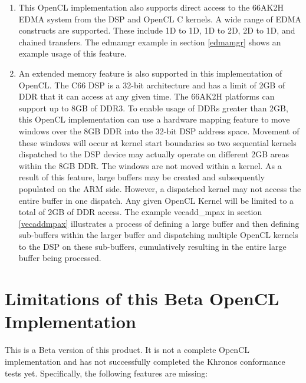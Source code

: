 \documentclass[10pt]{article}
\begin{document}
\begin{enumerate}
\item This OpenCL implementation also supports direct access to the 66AK2H
EDMA system from the DSP and OpenCL C kernels.  A wide range of EDMA
constructs are supported.  These include 1D to 1D, 1D to 2D, 2D to 1D, and chained
transfers.  The edmamgr example in section \ref{edmamgr} shows an example
usage of this feature.

\item An extended memory feature is also supported in this implementation of
OpenCL.  The C66 DSP is a 32-bit architecture and has a limit of 2GB of DDR
that it can access at any given time. The 66AK2H platforms can support up to
8GB of DDR3.  To enable usage of DDRs greater than 2GB, this OpenCL
implementation can use a hardware mapping feature to move windows over the 8GB
DDR into the 32-bit DSP address space.  Movement of these windows will occur
at kernel start boundaries so two sequential kernels dispatched to the DSP
device may actually operate on different 2GB areas within the 8GB DDR.  The
windows are not moved within a kernel.  As a result of this feature, large
buffers may be created and subsequently populated on the ARM side.  However, a
dispatched kernel may not access the entire buffer in one dispatch. Any given
OpenCL Kernel will be limited to a total of 2GB of DDR access.  The example
vecadd\_mpax in section \ref{vecaddmpax} illustrates a process of defining a
large buffer and then defining sub-buffers within the larger buffer and
dispatching multiple OpenCL kernels to the DSP on these sub-buffers,
cumulatively resulting in the entire large buffer being processed.

\end{enumerate}


\newpage
\section{Limitations of this Beta OpenCL Implementation}
This is a Beta version of this product.  It is not a complete OpenCL
implementation and has not successfully completed the Khronos conformance
tests yet.  Specifically, the following features are missing:
\end{document}

